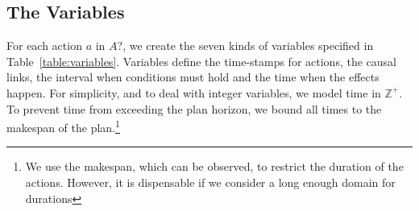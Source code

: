 \documentclass{ecai}
\newcommand{\dur}{\mathsf{dur}}    %
\newcommand{\start}{\mathsf{start}}%
\newcommand{\tim}{\mathsf{time}}   %
\newcommand{\reqs}{\mathsf{req\_{start}}} %
\newcommand{\reqe}{\mathsf{req\_{end}}}   %
\begin{document}


\subsection{The Variables}


For each action $a$ in $A?$, we create the seven kinds of variables specified in Table~\ref{table:variables}. Variables define the time-stamps for actions, the causal links, the interval when conditions must hold and the time when the effects happen. For simplicity, and to deal with integer variables, we model time in $\mathbb{Z}^+$. To prevent time from exceeding the plan horizon, we bound all times to the makespan of the plan.\footnote{We use the makespan, which can be observed, to restrict the duration of the actions. However, it is dispensable if we consider a long enough domain for durations}
\end{document}
